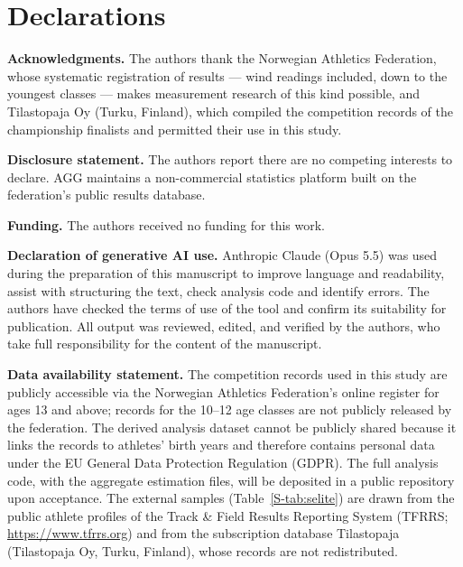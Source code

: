 \documentclass[12pt,a4paper]{article}
\begin{document}

\clearpage
\section*{Declarations}

\textbf{Acknowledgments.} The authors thank the Norwegian Athletics Federation, whose systematic registration of results --- wind readings included, down to the youngest classes --- makes measurement research of this kind possible, and Tilastopaja Oy (Turku, Finland), which compiled the competition records of the championship finalists and permitted their use in this study.

\textbf{Disclosure statement.} The authors report there are no competing interests to declare.\ifdefined\anonymous\else{} AGG maintains a non-commercial statistics platform built on the federation's public results database.\fi

\textbf{Funding.} The authors received no funding for this work.

\textbf{Declaration of generative AI use.} Anthropic Claude (Opus 5.5) was used during the preparation of this manuscript to improve language and readability, assist with structuring the text, check analysis code and identify errors. The authors have checked the terms of use of the tool and confirm its suitability for publication. All output was reviewed, edited, and verified by the authors, who take full responsibility for the content of the manuscript.

\textbf{Data availability statement.} The competition records used in this study are publicly accessible via the Norwegian Athletics Federation's online register for ages 13 and above; records for the 10--12 age classes are not publicly released by the federation. The derived analysis dataset cannot be publicly shared because it links the records to athletes' birth years and therefore contains personal data under the EU General Data Protection Regulation (GDPR). The full analysis code, with the aggregate estimation files, will be deposited in a public repository upon acceptance. The external samples (Table~\ref{S-tab:selite}) are drawn from the public athlete profiles of the Track \& Field Results Reporting System (TFRRS; \url{https://www.tfrrs.org}) and from the subscription database Tilastopaja (Tilastopaja Oy, Turku, Finland), whose records are not redistributed.

\end{document}

